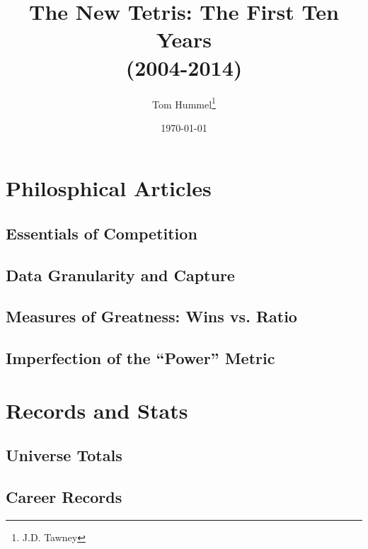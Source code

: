 \documentclass[a4paper,twoside,titlepage]{book}
\title{The New Tetris: The First Ten Years 
\\(2004-2014)}
\author{Tom Hummel\thanks{J.D. Tawney}}
\date{\today}
\begin{document}
  \maketitle
  \tableofcontents \newpage
  
  
  
  
  
  \part{Philosphical Articles}
    \chapter{Essentials of Competition}
    \chapter{Data Granularity and Capture}
    \chapter{Measures of Greatness: Wins vs. Ratio}
    \chapter{Imperfection of the ``Power'' Metric}
  \part{Records and Stats}
    \chapter{Universe Totals}
    \chapter{Career Records}
\end{document}
